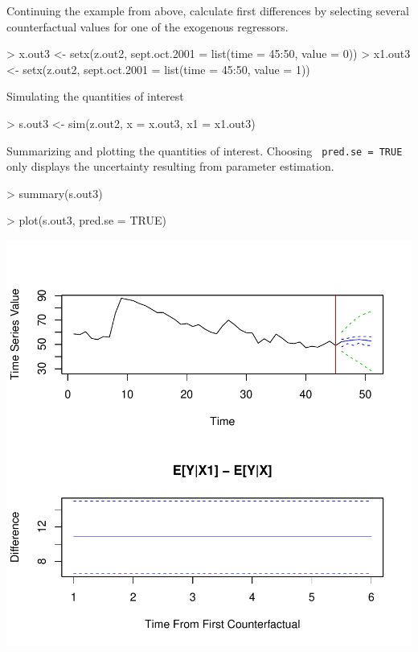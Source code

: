 \begin{enumerate}
Continuing the example from above, calculate first differences by
selecting several counterfactual values for one of the exogenous
regressors. 
\begin{Schunk}
\begin{Sinput}
> x.out3 <- setx(z.out2, sept.oct.2001 = list(time = 45:50, value = 0))
> x1.out3 <- setx(z.out2, sept.oct.2001 = list(time = 45:50, value = 1))
\end{Sinput}
\end{Schunk}
Simulating the quantities of interest
\begin{Schunk}
\begin{Sinput}
> s.out3 <- sim(z.out2, x = x.out3, x1 = x1.out3)
\end{Sinput}
\end{Schunk}
Summarizing and plotting the quantities of interest. Choosing {\tt
pred.se = TRUE} only displays the uncertainty resulting from parameter
estimation.  
\begin{Schunk}
\begin{Sinput}
> summary(s.out3)
\end{Sinput}
\end{Schunk}
\begin{center}
\begin{Schunk}
\begin{Sinput}
> plot(s.out3, pred.se = TRUE)
\end{Sinput}
\end{Schunk}
\includegraphics{vigpics/arima-Example3Plot}
\end{center} 
\end{enumerate}

